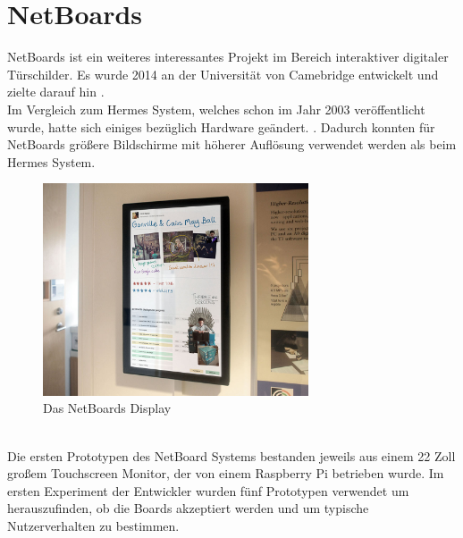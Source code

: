 \section{NetBoards}
NetBoards\cite{wood:2014,netboards:website} ist ein weiteres interessantes Projekt im Bereich interaktiver digitaler Türschilder. Es wurde 2014 an der Universität von Camebridge entwickelt und zielte darauf hin .
\\
Im Vergleich zum Hermes System, welches schon im Jahr 2003 veröffentlicht wurde, hatte sich einiges bezüglich Hardware geändert. .
Dadurch konnten für NetBoards größere Bildschirme mit höherer Auflösung  verwendet werden als beim Hermes System.
\begin{figure}[h!]
  \centering
    \includegraphics[width=0.7\textwidth]{./img/netBoards_display.png}
  \caption{Das NetBoards Display\cite{wood:2014}}
  \label{img:netBoardsDisplay}
\end{figure}
\\
Die ersten Prototypen des NetBoard Systems bestanden jeweils aus einem 22 Zoll großem Touchscreen Monitor, der von einem Raspberry Pi betrieben wurde.
Im ersten Experiment der Entwickler wurden fünf Prototypen verwendet um herauszufinden, ob die Boards akzeptiert werden und um typische Nutzerverhalten zu bestimmen.
